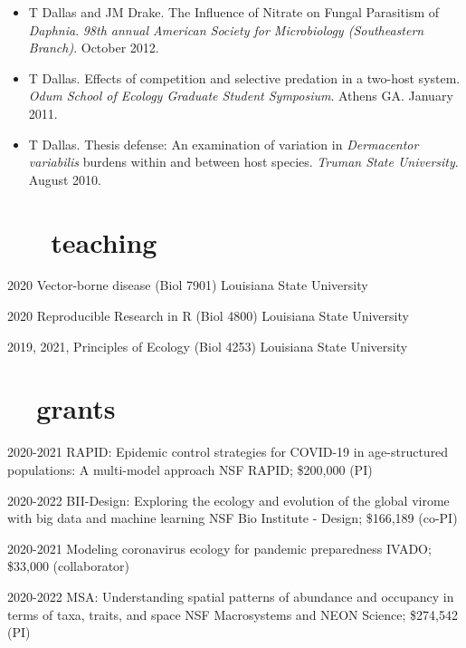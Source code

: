 \documentclass[]{CV}
\begin{document}
\begin{itemize}
\item {\mefont T Dallas} and JM Drake. The Influence of Nitrate on Fungal Parasitism of \textit{Daphnia}. \textit{98th annual American Society for Microbiology (Southeastern Branch)}. October 2012.

\item {\mefont T Dallas}. Effects of competition and selective predation in a two-host system. \textit{Odum School of Ecology Graduate Student Symposium}. Athens GA. January 2011.

\item {\mefont T Dallas}. Thesis defense: An examination of variation in \textit{Dermacentor variabilis} burdens within and between host species. \textit{Truman State University}. August 2010.

\end{itemize}






\section{ \faInstitution \ \ \ teaching}

\begin{entrylist}

  \entry
    {2020}
		{Vector-borne disease (Biol 7901)}
    {Louisiana State University}

  \entry
    {2020}
		{Reproducible Research in R (Biol 4800)}
    {Louisiana State University}

  \entry
    {2019, 2021, }
		{Principles of Ecology (Biol 4253)}
    {Louisiana State University}

\end{entrylist}





\section{\faDollar \ \ grants}

\begin{entrylist}
 \entry
 {2020-2021}
 {RAPID: Epidemic control strategies for COVID-19 in age-structured populations: A multi-model approach }
 {NSF RAPID; \$200,000 (PI)}

 \entry
 {2020-2022}
 {BII-Design: Exploring the ecology and evolution of the global virome with big data and machine learning}
 {NSF Bio Institute - Design; \$166,189 (co-PI)}

 \entry
 {2020-2021}
 {Modeling coronavirus ecology for pandemic preparedness}
 {IVADO; \$33,000 (collaborator)}

 \entry
 {2020-2022}
 {MSA: Understanding spatial patterns of abundance and occupancy in terms of taxa, traits, and space}
 {NSF Macrosystems and NEON Science; \$274,542 (PI)}


\end{entrylist}
\end{document}
